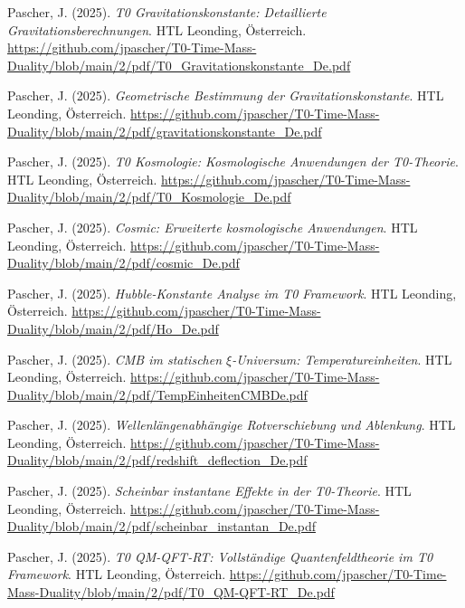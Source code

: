 \documentclass{article}
\begin{document}
\begin{thebibliography}{99}
		Pascher, J. (2025).
		\textit{T0 Gravitationskonstante: Detaillierte Gravitationsberechnungen}.
		HTL Leonding, Österreich.
		\url{https://github.com/jpascher/T0-Time-Mass-Duality/blob/main/2/pdf/T0_Gravitationskonstante_De.pdf}
		
		Pascher, J. (2025).
		\textit{Geometrische Bestimmung der Gravitationskonstante}.
		HTL Leonding, Österreich.
		\url{https://github.com/jpascher/T0-Time-Mass-Duality/blob/main/2/pdf/gravitationskonstante_De.pdf}
		
		
		Pascher, J. (2025).
		\textit{T0 Kosmologie: Kosmologische Anwendungen der T0-Theorie}.
		HTL Leonding, Österreich.
		\url{https://github.com/jpascher/T0-Time-Mass-Duality/blob/main/2/pdf/T0_Kosmologie_De.pdf}
		
		Pascher, J. (2025).
		\textit{Cosmic: Erweiterte kosmologische Anwendungen}.
		HTL Leonding, Österreich.
		\url{https://github.com/jpascher/T0-Time-Mass-Duality/blob/main/2/pdf/cosmic_De.pdf}
		
		Pascher, J. (2025).
		\textit{Hubble-Konstante Analyse im T0 Framework}.
		HTL Leonding, Österreich.
		\url{https://github.com/jpascher/T0-Time-Mass-Duality/blob/main/2/pdf/Ho_De.pdf}
		
		Pascher, J. (2025).
		\textit{CMB im statischen $\xi$-Universum: Temperatureinheiten}.
		HTL Leonding, Österreich.
		\url{https://github.com/jpascher/T0-Time-Mass-Duality/blob/main/2/pdf/TempEinheitenCMBDe.pdf}
		
		Pascher, J. (2025).
		\textit{Wellenlängenabhängige Rotverschiebung und Ablenkung}.
		HTL Leonding, Österreich.
		\url{https://github.com/jpascher/T0-Time-Mass-Duality/blob/main/2/pdf/redshift_deflection_De.pdf}
		
		Pascher, J. (2025).
		\textit{Scheinbar instantane Effekte in der T0-Theorie}.
		HTL Leonding, Österreich.
		\url{https://github.com/jpascher/T0-Time-Mass-Duality/blob/main/2/pdf/scheinbar_instantan_De.pdf}
		
		
		Pascher, J. (2025).
		\textit{T0 QM-QFT-RT: Vollständige Quantenfeldtheorie im T0 Framework}.
		HTL Leonding, Österreich.
		\url{https://github.com/jpascher/T0-Time-Mass-Duality/blob/main/2/pdf/T0_QM-QFT-RT_De.pdf}
		

\end{thebibliography}
\end{document}
